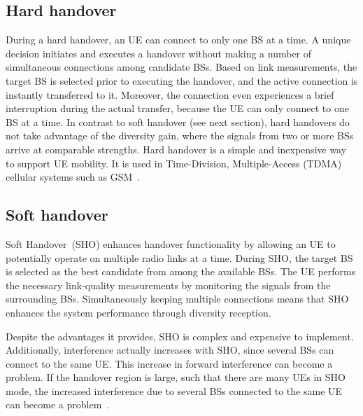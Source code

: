 \subsection{Hard handover}

During a hard handover, an UE can connect to only one BS at a time.
A unique decision initiates and executes a handover without making
a number of simultaneous connections among candidate BSs. Based on
link measurements, the target BS is selected prior to executing the
handover, and the active connection is instantly transferred to it.
Moreover, the connection even experiences a brief interruption during
the actual transfer, because the UE can only connect to one BS at
a time. In contrast to soft handover (see next section), hard handovers
do not take advantage of the diversity gain, where the signals from
two or more BSs arrive at comparable strengths. Hard handover is a
simple and inexpensive way to support UE mobility. It is used in Time-Division,
Multiple-Access (TDMA)
cellular systems such as GSM~\cite{Stuber-Principles_of_mobile_communication:2011}.


\subsection{Soft handover}

Soft Handover~(SHO) enhances
handover functionality by allowing an UE to potentially operate on
multiple radio links at a time. During SHO, the target BS is selected
as the best candidate from among the available BSs. The UE performs
the necessary link-quality measurements by monitoring the signals
from the surrounding BSs. Simultaneously keeping multiple connections
means that SHO enhances the system performance through diversity reception.

Despite the advantages it provides, SHO is complex and expensive to
implement. Additionally, interference actually increases with SHO,
since several BSs can connect to the same UE. This increase in forward
interference can become a problem. If the handover region is large,
such that there are many UEs in SHO mode, the increased interference
due to several BSs connected to the same UE can become a problem~\cite{Stuber-Principles_of_mobile_communication:2011}.

